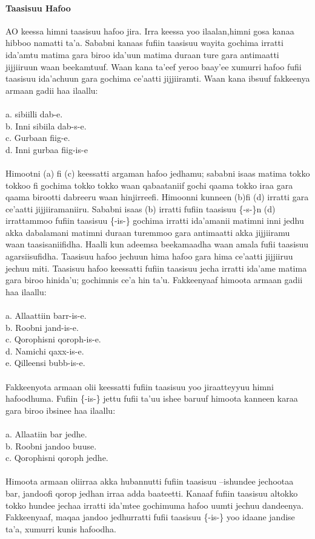 \documentclass[11pt,b5paper]{book}
\begin{document}
\paragraph{Taasisuu Hafoo}
AO keessa himni taasisuu hafoo  jira. Irra keessa yoo ilaalan,himni gosa kanaa hibboo namatti ta’a. Sababni kanaas fufiin taasisuu wayita gochima irratti ida’amtu matima gara biroo ida’uun matima duraan ture gara antimaatti jijjiiruun waan beekamtuuf. Waan kana ta’eef yeroo baay’ee xumurri hafoo
fufii taasisuu ida’achuun gara gochima ce’aatti jijjiiramti. Waan kana ibsuuf fakkeenya armaan gadii haa ilaallu: \\
\\
a. sibiilli dab-e.\\
b. Inni sibiila dab-s-e.\\
c. Gurbaan fiig-e.\\
d. Inni gurbaa fiig-is-e\\
\\
Himootni (a) fi (c) keessatti argaman hafoo jedhamu; sababni isaas matima tokko tokkoo fi gochima tokko tokko waan qabaataniif gochi qaama tokko iraa gara qaama birootti dabreeru waan hinjirreefi. Himoonni kunneen (b)fi (d) irratti gara ce’aatti jijjiiramaniiru. Sababni isaas (b) irratti fufiin
taasisuu \{-s-\}n (d) irrattammoo fufiin taasisuu \{-is-\} gochima irratti ida’amanii matimni inni jedhu akka dabalamani matimni duraan turemmoo gara antimaatti akka jijjiiramu waan taasisaniifidha. Haalli kun adeemsa beekamaadha waan amala fufii taasisuu agarsiisufidha. Taasisuu hafoo jechuun hima
hafoo gara hima ce’aatti jijjiiruu jechuu miti. Taasisuu hafoo keessatti fufiin taasisuu jecha irratti ida’ame matima gara biroo hinida’u; gochimnis ce’a hin ta’u. Fakkeenyaaf himoota armaan gadii haa ilaallu:\\
\\
a. Allaattiin barr-is-e.\\
b. Roobni jand-is-e.\\
c. Qorophisni qoroph-is-e.\\
d. Namichi qaxx-is-e.\\
e. Qilleensi bubb-is-e. \\
\\
Fakkeenyota armaan olii keessatti fufiin taasisuu yoo jiraatteyyuu himni hafoodhuma. Fufiin \{-is-\} jettu fufii ta’uu ishee baruuf himoota kanneen karaa gara biroo ibsinee haa ilaallu: \\
\\
a. Allaatiin bar jedhe.\\
b. Roobni jandoo buuse.\\
c. Qorophisni qoroph jedhe.\\
\\
Himoota armaan oliirraa akka hubannutti fufiin taasisuu –ishundee jechootaa bar, jandoofi qorop jedhan irraa adda baateetti. Kanaaf fufiin taasisuu altokko tokko hundee jechaa irratti ida’mtee gochimuma hafoo uumti jechuu dandeenya. Fakkeenyaaf, maqaa jandoo jedhurratti fufii taasisuu \{-is-\} yoo
idaane jandise ta’a, xumurri kunis hafoodha.
\end{document}
